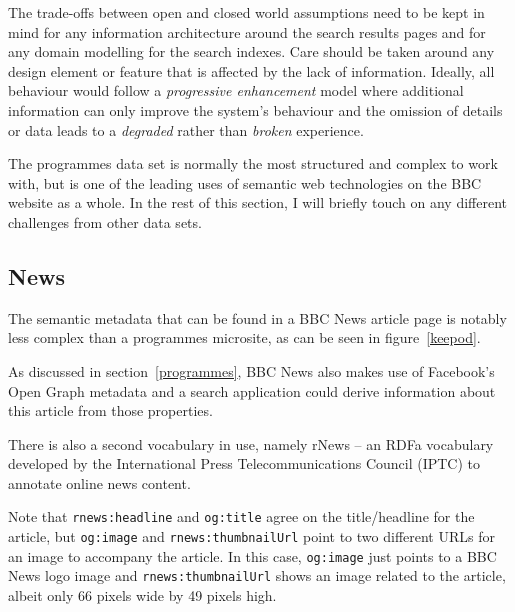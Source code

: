 The trade-offs between open and closed world assumptions need to
be kept in mind for any information architecture around the
search results pages and for any domain modelling for the
search indexes. Care should be taken around any design element
or feature that is affected by the lack of information. Ideally,
all behaviour would follow a \emph{progressive enhancement} model
where additional information can only improve the system's
behaviour
and the omission of details or data leads to a \emph{degraded}
rather than \emph{broken} experience.

The programmes data set is normally the most structured and
complex to work with, but is one of the leading uses of
semantic web technologies on the BBC website as a whole. In
the rest of this section, I will briefly touch on any different
challenges from other data sets.

\subsection{News}

The semantic metadata that can be found in a BBC News article
page is notably less complex than a programmes microsite, as
can be seen in figure~\ref{keepod}.

\begin{sidewaysfigure}
  \begin{center}
  \end{center}
  \caption{Metadata found within a BBC News article page}
  \label{keepod}
\end{sidewaysfigure}

As discussed in section~\ref{programmes}, BBC News also makes
use of Facebook's Open Graph metadata and a search application
could derive information about this article from those properties.

There is also a second vocabulary in use, namely rNews -- an RDFa
vocabulary developed by the International Press Telecommunications Council
(IPTC) to annotate online news content.

Note that \texttt{rnews:headline} and \texttt{og:title} agree on
the title/headline for the article, but \texttt{og:image} and
\texttt{rnews:thumbnailUrl} point to two different URLs for
an image to accompany the article. In this case, \texttt{og:image}
just points to a BBC News logo image and \texttt{rnews:thumbnailUrl}
shows an image related to the article, albeit only 66 pixels wide
by 49 pixels high.

